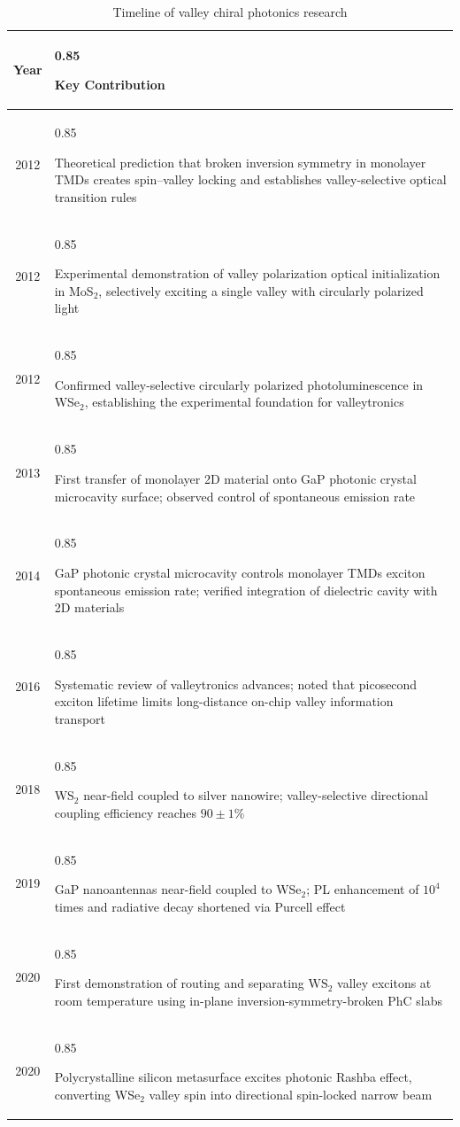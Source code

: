 \begin{table}[H]
\centering
\caption{Timeline of valley chiral photonics research}
\label{tab:timeline_valley}
\small
\renewcommand{\arraystretch}{0.01} 
\begin{tabular}{c >{\begin{spacing}{0.85}\raggedright\arraybackslash}p{11cm}<{\end{spacing}}}
\toprule
\textbf{Year} & \textbf{Key Contribution} \\
\midrule
2012 & Theoretical prediction that broken inversion symmetry in monolayer TMDs creates spin--valley locking and establishes valley-selective optical transition rules \cite{xiao2012coupled} \\
2012 & Experimental demonstration of valley polarization optical initialization in MoS$_2$, selectively exciting a single valley with circularly polarized light \cite{mak2012control} \\
2012 & Confirmed valley-selective circularly polarized photoluminescence in WSe$_2$, establishing the experimental foundation for valleytronics \cite{zeng2012valley} \\
2013 & First transfer of monolayer 2D material onto GaP photonic crystal microcavity surface; observed control of spontaneous emission rate \cite{gan2013controlling} \\
2014 & GaP photonic crystal microcavity controls monolayer TMDs exciton spontaneous emission rate; verified integration of dielectric cavity with 2D materials \cite{Wu2014control} \\
2016 & Systematic review of valleytronics advances; noted that picosecond exciton lifetime limits long-distance on-chip valley information transport \cite{schaibley2016valleytronics} \\
2018 & WS$_2$ near-field coupled to silver nanowire; valley-selective directional coupling efficiency reaches $90\pm1$\% \cite{gong2018nanoscale} \\
2019 & GaP nanoantennas near-field coupled to WSe$_2$; PL enhancement of $10^4$ times and radiative decay shortened via Purcell effect \cite{sortino2019enhanced} \\
2020 & First demonstration of routing and separating $\text{WS}_2$ valley excitons at room temperature using in-plane inversion-symmetry-broken PhC slabs \cite{wang2020routing} \\
2020 & Polycrystalline silicon metasurface excites photonic Rashba effect, converting WSe$_2$ valley spin into directional spin-locked narrow beam \cite{rong2020photonic} \\

\end{tabular}
\end{table}
